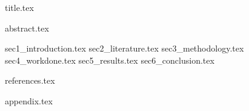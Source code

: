 \documentclass[12pt,a4paper]{article}
\begin{document}
{title.tex}

\setcounter{page}{1}

{abstract.tex}
\clearpage

\tableofcontents
\clearpage
\listoffigures
\clearpage
\listoftables
\clearpage

\setcounter{page}{1}

{sec1_introduction.tex}
{sec2_literature.tex}
{sec3_methodology.tex}
{sec4_workdone.tex}
{sec5_results.tex}
{sec6_conclusion.tex}

\clearpage
\begingroup
\fontsize{10}{12}\selectfont
{references.tex}
\endgroup

\clearpage
{appendix.tex}
\end{document}
